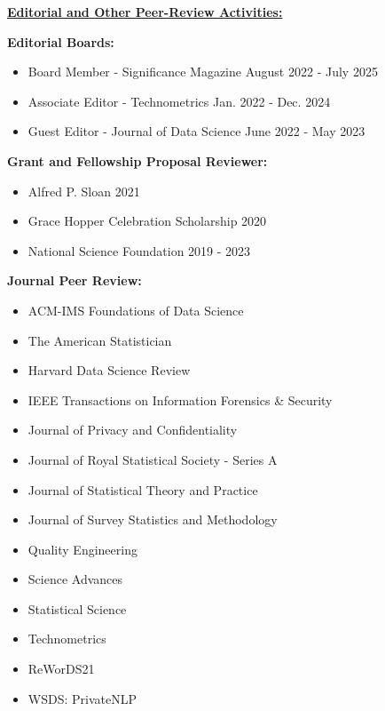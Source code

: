 \professionalspace
\underline{\textbf{\large Editorial and Other Peer-Review Activities:}}\normalsize

\textbf{Editorial Boards:}
\begin{itemize}
    \item Board Member - Significance Magazine \hfill August 2022 - July 2025
    \item Associate Editor - Technometrics \hfill Jan. 2022 - Dec. 2024
    \item Guest Editor - Journal of Data Science \hfill June 2022 - May 2023
\end{itemize}

\vspace{5pt}
\textbf{Grant and Fellowship Proposal Reviewer:}
\begin{itemize}
    \item Alfred P. Sloan \hfill 2021
    \item Grace Hopper Celebration Scholarship \hfill 2020
    \item National Science Foundation \hfill 2019 - 2023
\end{itemize}

\vspace{5pt}
\textbf{Journal Peer Review:}
\vspace{-10pt}
\begin{multicols}{2}
    \begin{itemize}
        \item ACM-IMS Foundations of Data Science
        \item The American Statistician
        \item Harvard Data Science Review
        \item IEEE Transactions on Information Forensics \& Security
        \item Journal of Privacy and Confidentiality
        \item Journal of Royal Statistical Society - Series A
        \item Journal of Statistical Theory and Practice
        \item Journal of Survey Statistics and Methodology
        \item Quality Engineering
        \item Science Advances
        \item Statistical Science
        \item Technometrics
        \item ReWorDS21
        \item WSDS: PrivateNLP
    \end{itemize}
\end{multicols}

